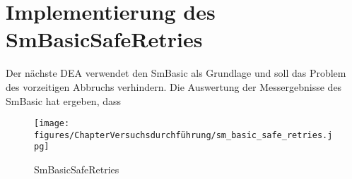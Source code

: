 \section{Implementierung des SmBasicSafeRetries}

Der nächste DEA verwendet den SmBasic als Grundlage und soll das Problem des vorzeitigen Abbruchs verhindern. Die Auswertung der Messergebnisse des SmBasic hat ergeben, dass 

\begin{figure}[h!]
	\centering
	\texttt{[image: figures/ChapterVersuchsdurchführung/sm\_basic\_safe\_retries.jpg]}
	\caption{SmBasicSafeRetries}
\end{figure}
\FloatBarrier